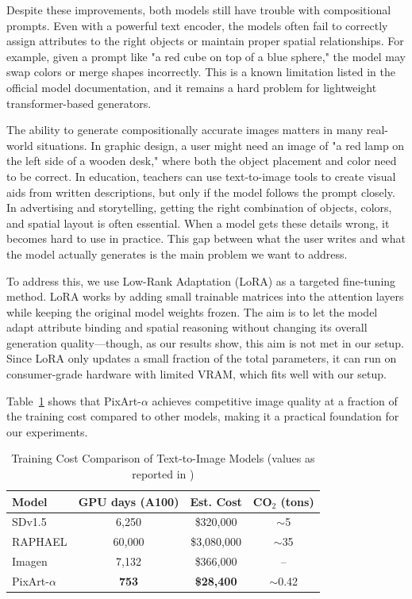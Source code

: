 \documentclass[12pt,onecolumn]{IEEEtran}
\begin{document}
Despite these improvements, both models still have trouble with compositional prompts. Even with a powerful text encoder, the models often fail to correctly assign attributes to the right objects or maintain proper spatial relationships. For example, given a prompt like "a red cube on top of a blue sphere," the model may swap colors or merge shapes incorrectly. This is a known limitation listed in the official model documentation, and it remains a hard problem for lightweight transformer-based generators.

The ability to generate compositionally accurate images matters in many real-world situations. In graphic design, a user might need an image of "a red lamp on the left side of a wooden desk," where both the object placement and color need to be correct. In education, teachers can use text-to-image tools to create visual aids from written descriptions, but only if the model follows the prompt closely. In advertising and storytelling, getting the right combination of objects, colors, and spatial layout is often essential. When a model gets these details wrong, it becomes hard to use in practice. This gap between what the user writes and what the model actually generates is the main problem we want to address.

To address this, we use Low-Rank Adaptation (LoRA) \cite{hu2021lora} as a targeted fine-tuning method. LoRA works by adding small trainable matrices into the attention layers while keeping the original model weights frozen. The aim is to let the model adapt attribute binding and spatial reasoning without changing its overall generation quality---though, as our results show, this aim is not met in our setup. Since LoRA only updates a small fraction of the total parameters, it can run on consumer-grade hardware with limited VRAM, which fits well with our setup.

Table~\ref{tab:training_cost} shows that PixArt-$\alpha$ achieves competitive image quality at a fraction of the training cost compared to other models, making it a practical foundation for our experiments.

\begin{table}[h]
\centering
\caption{Training Cost Comparison of Text-to-Image Models (values as reported in \cite{chen2023pixartalpha})}
\label{tab:training_cost}
\begin{tabular}{lccc}
\hline
\textbf{Model} & \textbf{GPU days (A100)} & \textbf{Est. Cost} & \textbf{CO$_2$ (tons)} \\
\hline
SDv1.5 & 6,250 & \$320,000 & $\sim$5 \\
RAPHAEL & 60,000 & \$3,080,000 & $\sim$35 \\
Imagen & 7,132 & \$366,000 & -- \\
PixArt-$\alpha$ & \textbf{753} & \textbf{\$28,400} & $\sim$0.42 \\
\hline
\end{tabular}
\end{table}
\end{document}
